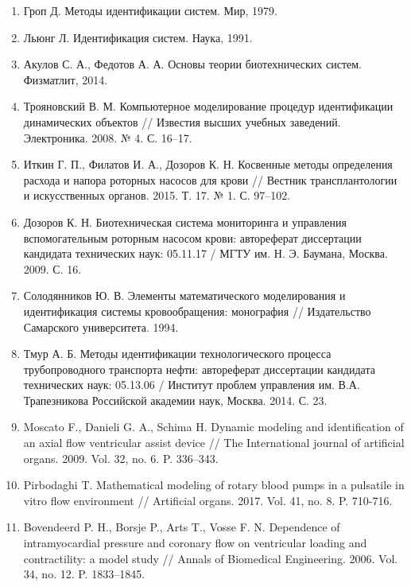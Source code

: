 \begin{enumerate}[leftmargin=25pt, itemsep=12pt]
 \item Гроп Д. Методы идентификации систем. Мир, 1979.
 \item Льюнг Л. Идентификация систем. Наука, 1991.
 \item Акулов С. А., Федотов А. А. Основы теории биотехнических систем. Физматлит, 2014.
 \item Трояновский В. М. Компьютерное моделирование процедур идентификации динамических объектов // Известия высших учебных заведений. Электроника. 2008. № 4. С. 16--17.
 \item Иткин Г. П., Филатов И. А., Дозоров К. Н. Косвенные методы определения расхода и напора роторных насосов для крови // Вестник трансплантологии и искусственных органов. 2015. Т. 17. № 1. С. 97--102.
 \item Дозоров К. Н. Биотехническая система мониторинга и управления вспомогательным роторным насосом крови: автореферат диссертации кандидата технических наук: 05.11.17 / МГТУ им. Н. Э. Баумана, Москва. 2009. С. 16.
 \item Солодянников Ю. В. Элементы математического моделирования и идентификация системы кровообращения: монография // Издательство Самарского университета. 1994.
 \item Тмур А. Б. Методы идентификации технологического процесса трубопроводного транспорта нефти: автореферат диссертации кандидата технических наук: 05.13.06 / Институт проблем управления им. В.А. Трапезникова Российской академии наук, Москва. 2014. С. 23.
 \item Moscato F., Danieli G. A., Schima H. Dynamic modeling and identification of an axial flow ventricular assist device // The International journal of artificial organs. 2009. Vol. 32, no. 6. P. 336--343.
 \item Pirbodaghi T. Mathematical modeling of rotary blood pumps in a pulsatile in vitro flow environment // Artificial organs. 2017. Vol. 41, no. 8. P. 710-716.
 \item Bovendeerd P. H., Borsje P., Arts T., Vosse F. N. Dependence of intramyocardial pressure and coronary flow on ventricular loading and contractility: a model study // Annals of Biomedical Engineering. 2006. Vol. 34, no. 12. P. 1833--1845.

\end{enumerate}
